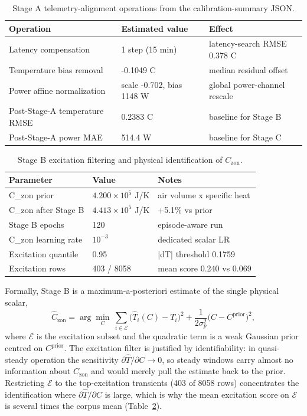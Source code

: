 \documentclass[11pt,a4paper]{article}
\newcommand{\Czon}{\ensuremath{C_{\mathrm{zon}}}}
\newcommand{\That}{\ensuremath{\widehat{T}}}
\begin{document}
\begin{table}[H]
\centering
\small
\caption{Stage A telemetry-alignment operations from the calibration-summary JSON.}
\label{tab:stage-a}
\begin{tabularx}{\linewidth}{llX}
\toprule
Operation & Estimated value & Effect \\
\midrule
Latency compensation & 1 step (15 min) & latency-search RMSE 0.378 C \\
Temperature bias removal & -0.1049 C & median residual offset \\
Power affine normalization & scale -0.702, bias 1148 W & global power-channel rescale \\
Post-Stage-A temperature RMSE & 0.2383 C & baseline for Stage B \\
Post-Stage-A power MAE & 514.4 W & baseline for Stage C \\
\bottomrule
\end{tabularx}
\end{table}

\begin{table}[H]
\centering
\small
\caption{Stage B excitation filtering and physical identification of \(\Czon\).}
\label{tab:stage-b}
\begin{tabularx}{\linewidth}{llX}
\toprule
Parameter & Value & Notes \\
\midrule
C\_zon prior & $4.200\times10^5$ J/K & air volume x specific heat \\
C\_zon after Stage B & $4.413\times10^5$ J/K & +5.1\% vs prior \\
Stage B epochs & 120 & episode-aware run \\
C\_zon learning rate & $10^{-3}$ & dedicated scalar LR \\
Excitation quantile & 0.95 & |dT| threshold 0.1759 \\
Excitation rows & 403 / 8058 & mean score 0.240 vs 0.069 \\
\bottomrule
\end{tabularx}
\end{table}

Formally, Stage B is a maximum-a-posteriori estimate of the single physical scalar,
\begin{equation}
  \hat C_{\mathrm{zon}}
  = \arg\min_{C}\ \sum_{i\in\mathcal{E}}\big(\That_i(C)-T_i\big)^2
  + \frac{1}{2\sigma_p^2}\big(C-C^{\mathrm{prior}}\big)^2,
  \label{eq:stageb-map}
\end{equation}
where \(\mathcal{E}\) is the excitation subset and the quadratic term is a weak Gaussian prior centred on \(C^{\mathrm{prior}}\). The excitation filter is justified by identifiability: in quasi-steady operation the sensitivity \(\partial\That/\partial C\to 0\), so steady windows carry almost no information about \(\Czon\) and would merely pull the estimate back to the prior. Restricting \(\mathcal{E}\) to the top-excitation transients (403 of 8058 rows) concentrates the identification where \(\partial\That/\partial C\) is large, which is why the mean excitation score on \(\mathcal{E}\) is several times the corpus mean (Table~\ref{tab:stage-b}).
\end{document}
